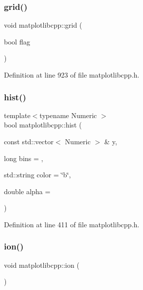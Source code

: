\subsubsection{\texorpdfstring{grid()}{grid()}}
{\footnotesize\ttfamily void matplotlibcpp\+::grid (\begin{DoxyParamCaption}\item[{bool}]{flag }\end{DoxyParamCaption})\hspace{0.3cm}{\ttfamily [inline]}}



Definition at line 923 of file matplotlibcpp.\+h.

\mbox{\label{namespacematplotlibcpp_ac0295119bc4ecb6cedd18509409eefd3}} 
\subsubsection{\texorpdfstring{hist()}{hist()}}
{\footnotesize\ttfamily template$<$typename Numeric $>$ \\
bool matplotlibcpp\+::hist (\begin{DoxyParamCaption}\item[{const std\+::vector$<$ Numeric $>$ \&}]{y,  }\item[{long}]{bins = {},  }\item[{std\+::string}]{color = {\ttfamily \char`\"{}b\char`\"{}},  }\item[{double}]{alpha = {} }\end{DoxyParamCaption})}



Definition at line 411 of file matplotlibcpp.\+h.

\mbox{\label{namespacematplotlibcpp_a9bddb5276ddc48f4ff9c2b36b98db71a}} 
\subsubsection{\texorpdfstring{ion()}{ion()}}
{\footnotesize\ttfamily void matplotlibcpp\+::ion (\begin{DoxyParamCaption}{ }\end{DoxyParamCaption})\hspace{0.3cm}{\ttfamily [inline]}}



